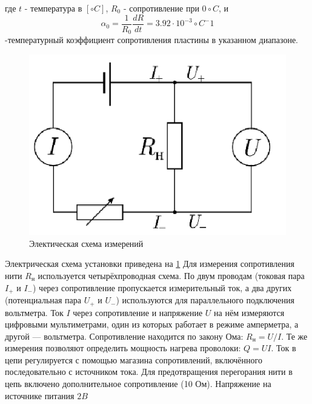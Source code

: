 \documentclass[12pt]{article}
\begin{document}
        где $t$ - температура в $[\circ C]$, $R_0$ - сопротивление при $0 \circ C$, и
        \[
            \alpha_0 = \frac{1}{R_0}\frac{dR}{dt} = 3.92\cdot 10^{-3} \circ C^-1
        \]
        -температурный коэффициент сопротивления пластины в указанном диапазоне.
        \begin{figure}[H]
            \centering
            \includegraphics[width=0.4\linewidth]{electricity.png}
            \caption{Электическая схема измерений}
            \label{electricity}
        \end{figure}
        Электрическая схема установки приведена на \ref{electricity} Для измерения сопротивления нити $R_{\text{н}}$
        используется четырёхпроводная схема. По двум проводам (токовая пара $I_{+}$ и $I_{-}$) через сопротивление
        пропускается измерительный ток, а два других (потенциальная пара $U_{+}$ и $U_{-}$) используются
        для параллельного подключения вольтметра. Ток $I$ через сопротивление и напряжение $U$ на нём
        измеряются цифровыми мультиметрами, один из которых работает в режиме амперметра, а другой — вольтметра.
        Сопротивление находится по закону Ома: $R_{\text{н}} = U/I$. Те же измерения позволяют определить мощность
        нагрева проволоки: $Q = UI$. Ток в цепи регулируется с помощью магазина сопротивлений, включённого
        последовательно с источником тока. Для предотвращения перегорания нити в цепь включено дополнительное
        сопротивление (10 Ом). Напряжение на источнике питания $2 B$
\end{document}
